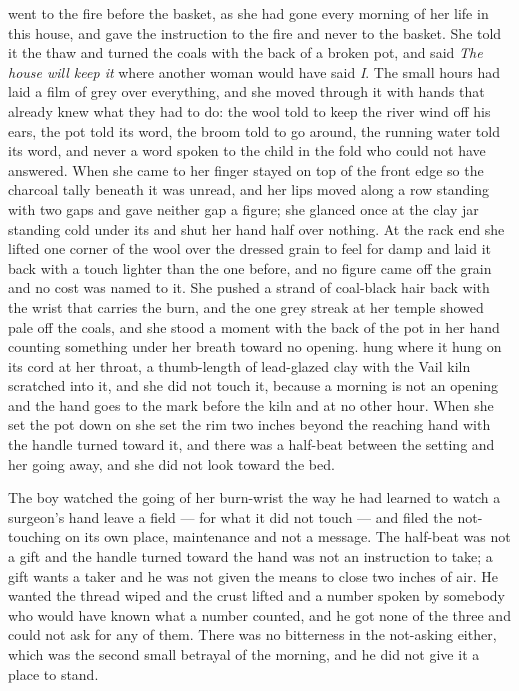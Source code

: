  went to the fire before the basket, as she had gone every morning of her life in this house, and gave the instruction to the fire and never to the basket. She told it the thaw and turned the coals with the back of a broken pot, and said \emph{The house will keep it} where another woman would have said \emph{I}. The small hours had laid a film of grey over everything, and she moved through it with hands that already knew what they had to do: the wool told to keep the river wind off his ears, the pot told its word, the broom told to go around, the running water told its word, and never a word spoken to the child in the fold who could not have answered. When she came to  her finger stayed on top of the front edge so the charcoal tally beneath it was unread, and her lips moved along a row standing with two gaps and gave neither gap a figure; she glanced once at the clay jar standing cold under its  and shut her hand half over nothing. At the rack end she lifted one corner of the wool over the dressed grain to feel for damp and laid it back with a touch lighter than the one before, and no figure came off the grain and no cost was named to it. She pushed a strand of coal-black hair back with the wrist that carries the burn, and the one grey streak at her temple showed pale off the coals, and she stood a moment with the back of the pot in her hand counting something under her breath toward no opening.  hung where it hung on its cord at her throat, a thumb-length of lead-glazed clay with the Vail kiln scratched into it, and she did not touch it, because a morning is not an opening and the hand goes to the mark before the kiln and at no other hour. When she set the pot down on  she set the rim two inches beyond the reaching hand with the handle turned toward it, and there was a half-beat between the setting and her going away, and she did not look toward the bed.

The boy watched the going of her burn-wrist the way he had learned to watch a surgeon's hand leave a field --- for what it did not touch --- and filed the not-touching on its own place, maintenance and not a message. The half-beat was not a gift and the handle turned toward the hand was not an instruction to take; a gift wants a taker and he was not given the means to close two inches of air. He wanted the thread wiped and the crust lifted and a number spoken by somebody who would have known what a number counted, and he got none of the three and could not ask for any of them. There was no bitterness in the not-asking either, which was the second small betrayal of the morning, and he did not give it a place to stand.

